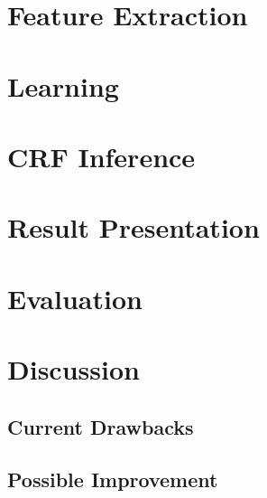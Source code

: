 \documentclass[10pt,twocolumn,letterpaper]{article}
\begin{document}
\section{Feature Extraction}

\section{Learning}

\section{CRF Inference}

\section{Result Presentation}

\section{Evaluation}

\section{Discussion}
\subsection{Current Drawbacks}
\subsection{Possible Improvement}
\end{document}
